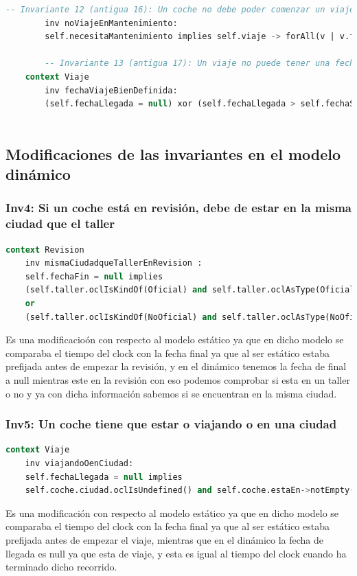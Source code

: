 \documentclass[12pt.a4paper]{article}
\begin{document}
\begin{lstlisting}[style = useNormal,language=SQL, caption={Codigo Use del apartado B}]
    -- Invariante 12 (antigua 16): Un coche no debe poder comenzar un viaje con la alerta de mantenimiento en true
        inv noViajeEnMantenimiento:
        self.necesitaMantenimiento implies self.viaje -> forAll(v | v.fechaLlegada <> null)
    
        -- Invariante 13 (antigua 17): Un viaje no puede tener una fecha de inicio superior a su fecha de llegada
    context Viaje
        inv fechaViajeBienDefinida:
        (self.fechaLlegada = null) xor (self.fechaLlegada > self.fechaSalida)
    
\end{lstlisting}

\subsection{Modificaciones de las invariantes en el modelo dinámico}
\subsubsection{Inv4: Si un coche está en revisión, debe de estar en la misma ciudad que el taller}
    \begin{lstlisting}[style = useEspecifico,language=SQL]
context Revision
    inv mismaCiudadqueTallerEnRevision :
    self.fechaFin = null implies 
    (self.taller.oclIsKindOf(Oficial) and self.taller.oclAsType(Oficial).ciudad = self.coche.ciudad)
    or
    (self.taller.oclIsKindOf(NoOficial) and self.taller.oclAsType(NoOficial).ciudad = self.coche.ciudad)
    \end{lstlisting}
    Es una modificacioón con respecto al modelo estático ya que en dicho modelo se comparaba el tiempo del clock con la fecha final ya que al ser estático estaba prefijada antes de empezar la revisión, y en el dinámico tenemos la fecha de final a null mientras este en la revisión con eso podemos comprobar si esta en un taller o no y ya con dicha información sabemos si se encuentran en la misma ciudad.

\subsubsection{Inv5: Un coche tiene que estar o viajando o en una ciudad}
    \begin{lstlisting}[style = useEspecifico,language=SQL]
context Viaje
    inv viajandoOenCiudad:
    self.fechaLlegada = null implies
    self.coche.ciudad.oclIsUndefined() and self.coche.estaEn->notEmpty()
    \end{lstlisting}
    Es una modificación con respecto al modelo estático ya que en dicho modelo se comparaba el tiempo del clock con la fecha final ya que al ser estático estaba prefijada antes de empezar el viaje, mientras que en el dinámico la fecha de llegada es null ya que esta de viaje, y esta es igual al tiempo del clock cuando ha terminado dicho recorrido.
\end{document}
